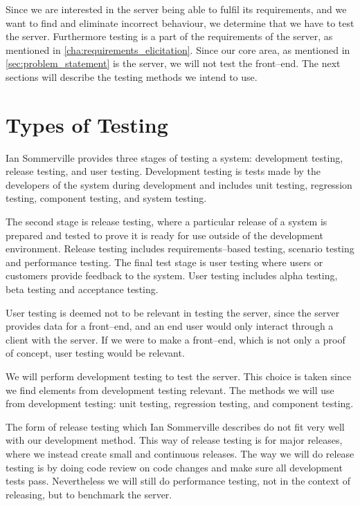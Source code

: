 Since we are interested in the server being able to fulfil its requirements,
and we want to find and eliminate incorrect behaviour, we determine that we have to test the server.
Furthermore testing is a part of the requirements of the server, as mentioned in \cref{cha:requirements_elicitation}.
Since our core area, as mentioned in \cref{sec:problem_statement} is the server, we will not test the front--end.
The next sections will describe the testing methods we intend to use.

\section{Types of Testing}
Ian Sommerville provides three stages of testing a system\cite[p.~231]{software_engineering}:
development testing, release testing, and user testing.
Development testing is tests made by the developers of the system during development
and includes unit testing, regression testing, component testing,
and system testing\cite[p.~232]{software_engineering}.

The second stage is release testing,
where a particular release of a system is prepared and tested to prove it is ready for use outside of the development environment\cite[p.~245]{software_engineering}.
Release testing includes requirements--based testing, scenario testing and performance testing.
The final test stage is user testing where users or customers provide feedback to the system.\cite[p.~249]{software_engineering}
User testing includes alpha testing, beta testing and acceptance testing.

User testing is deemed not to be relevant in testing the server,
since the server provides data for a front--end,
and an end user would only interact through a client with the server.
If we were to make a front--end, which is not only a proof of concept, user testing would be relevant.

We will perform development testing to test the server.
This choice is taken since we find elements from development testing relevant.
The methods we will use from development testing:
unit testing, regression testing, and component testing.

The form of release testing which Ian Sommerville describes do not fit very well with our development method.
This way of release testing is for major releases, where we instead create small and continuous releases.
The way we will do release testing is by doing code review on code changes and make sure all development tests pass.
Nevertheless we will still do performance testing, not in the context of releasing, but to benchmark the server.

